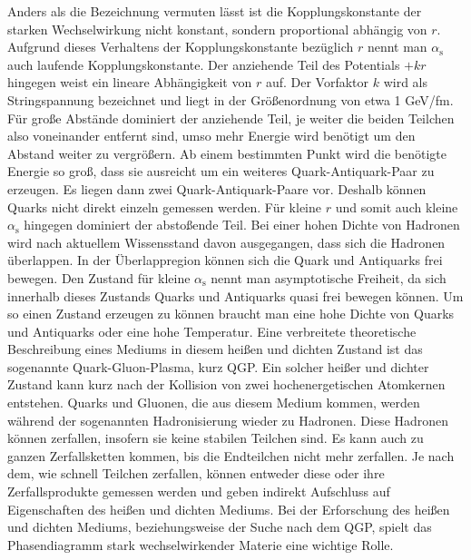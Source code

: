 Anders als die Bezeichnung vermuten l\"asst ist die Kopplungskonstante der starken Wechselwirkung nicht konstant, sondern proportional abh\"angig von $r$.
Aufgrund dieses Verhaltens der Kopplungskonstante bez\"uglich $r$ nennt man $\alpha_\text{s}$ auch laufende Kopplungskonstante.
\newline
Der anziehende Teil des Potentials $+kr$ hingegen weist ein lineare Abh\"angigkeit von $r$ auf.
Der Vorfaktor $k$ wird als Stringspannung bezeichnet und liegt in der Gr\"o{\ss}enordnung von etwa 1 GeV/fm.
F\"ur gro{\ss}e Abst\"ande dominiert der anziehende Teil, je weiter die beiden Teilchen also voneinander entfernt sind, umso mehr Energie wird ben\"otigt um den Abstand weiter zu vergr\"o{\ss}ern.
Ab einem bestimmten Punkt wird die ben\"otigte Energie so gro{\ss}, dass sie ausreicht um ein weiteres Quark-Antiquark-Paar zu erzeugen.
Es liegen dann zwei Quark-Antiquark-Paare vor.
Deshalb k\"onnen Quarks nicht direkt einzeln gemessen werden.
\newline
F\"ur kleine $r$ und somit auch kleine $\alpha_\text{s}$ hingegen dominiert der absto{\ss}ende Teil.
Bei einer hohen Dichte von Hadronen wird nach aktuellem Wissensstand davon ausgegangen, dass sich die Hadronen \"uberlappen.
In der \"Uberlappregion k\"onnen sich die Quark und Antiquarks frei bewegen.
Den Zustand f\"ur kleine $\alpha_\text{s}$ nennt man asymptotische Freiheit, da sich innerhalb dieses Zustands Quarks und Antiquarks quasi frei bewegen k\"onnen.
Um so einen Zustand erzeugen zu k\"onnen braucht man eine hohe Dichte von Quarks und Antiquarks oder eine hohe Temperatur.
Eine verbreitete theoretische Beschreibung eines Mediums in diesem hei{\ss}en und dichten Zustand ist das sogenannte Quark-Gluon-Plasma, kurz QGP.
\newline
Ein solcher hei{\ss}er und dichter Zustand kann kurz nach der Kollision von zwei hochenergetischen Atomkernen entstehen.
Quarks und Gluonen, die aus diesem Medium kommen, werden w\"ahrend der sogenannten Hadronisierung wieder zu Hadronen.
Diese Hadronen k\"onnen zerfallen, insofern sie keine stabilen Teilchen sind.
Es kann auch zu ganzen Zerfallsketten kommen, bis die Endteilchen nicht mehr zerfallen.
Je nach dem, wie schnell Teilchen zerfallen, k\"onnen entweder diese oder ihre Zerfallsprodukte gemessen werden und geben indirekt Aufschluss auf Eigenschaften des hei{\ss}en und dichten Mediums.
\newline
Bei der Erforschung des hei{\ss}en und dichten Mediums, beziehungsweise der Suche nach dem QGP, spielt das Phasendiagramm stark wechselwirkender Materie eine wichtige Rolle.

